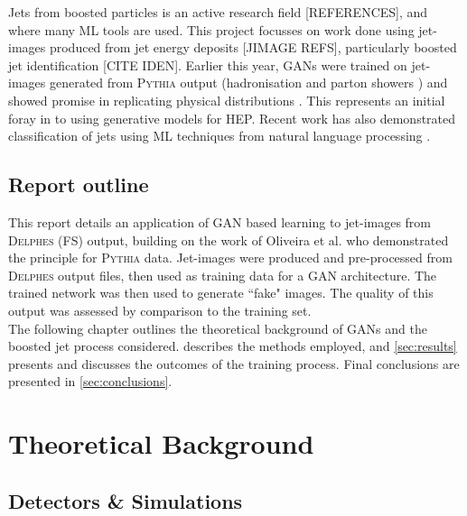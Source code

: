 \documentclass{report}
\newcommand{\pkg}[1]{\textsc{#1}}
\begin{document}
Jets from boosted particles is an active research field [REFERENCES], and where many ML tools are used.  This project focusses on work done using jet-images produced from jet energy deposits [JIMAGE REFS], particularly boosted jet identification [CITE IDEN]. Earlier this year, GANs were trained on jet-images generated from \pkg{Pythia} output (hadronisation and parton showers \cite{pythia}) and showed promise in replicating physical distributions \cite{de2017learning}. This represents an initial foray in to using generative models for HEP. Recent work has also demonstrated classification of jets using ML techniques from natural language processing \cite{louppe2017qcd}.

\section{Report outline}

This report details an application of GAN based learning to jet-images from \pkg{Delphes} (FS) output, building on the work of Oliveira et al. \cite{de2017learning} who demonstrated the principle for \pkg{Pythia} data. Jet-images were produced and pre-processed from \pkg{Delphes} output files, then used as training data for a GAN architecture. The trained network was then used to generate ``fake" images. The quality of this output was assessed by comparison to the training set. \\

The following chapter outlines the theoretical background of GANs and the boosted jet process considered.  describes the methods employed, and \cref{sec:results} presents and discusses the outcomes of the training process. Final conclusions are presented in \cref{sec:conclusions}.
	 
\chapter{Theoretical Background}
\label{sec:theory}


\section{Detectors \& Simulations}
\label{sec:detector}
\end{document}
